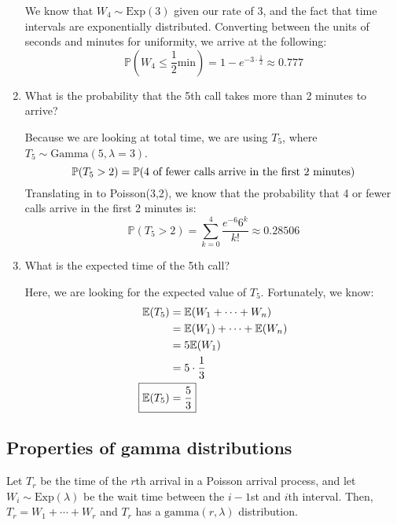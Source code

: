 \documentclass[titlepage, 12pt, leqno]{article}
\begin{document}
\begin{ex}
\begin{enumerate}
            We know that $W_4 \sim \text{Exp}(3)$ given our rate of 3, and the 
            fact that time intervals are exponentially distributed. Converting
            between the units of seconds and minutes for uniformity, we arrive
            at the following:
            \[
                \mathbb{P}\left(W_4 \le \frac{1}{2} \text{min}\right) = 
                1-e^{-3 \cdot \frac{1}{2}} \boxed{\approx 0.777}
            \]
        \item What is the probability that the 5th call takes more than 2 minutes
            to arrive?
            \vspace{10px}
            
            Because we are looking at total time, we are using $T_5$, where
            $T_5 \sim \text{Gamma}(5, \lambda=3)$.
            \[
               \mathbb{P}(T_5 > 2) = \mathbb{P}( \text{4 of fewer calls arrive
               in the first 2 minutes}) \\
            \]
            Translating in to Poisson(3,2), we know that the probability that
            4 or fewer calls arrive in the first 2 minutes is:
            \[
                \mathbb{P}(T_5 > 2) = \sum_{k=0}^{4}\frac{e^{-6}6^k}{k!}
                \boxed{\approx 0.28506} 
            \]
        \item What is the expected time of the 5th call?
            \vspace{10px}
            
            Here, we are looking for the expected value of $T_5$. Fortunately,
            we know:
           \begin{align*}
               \mathbb{E}(T_5) &= \mathbb{E}(W_1 + \cdots + W_n) \\
                               &= \mathbb{E}(W_1) + \cdots + \mathbb{E}(W_n) \\
                               &= 5 \mathbb{E}(W_1) \\
                               &= 5 \cdot \frac{1}{3} \\
               \Aboxed{ \mathbb{E}(T_5) &= \frac{5}{3}} 
           \end{align*}
    \end{enumerate}
\end{ex}

\subsection{Properties of gamma distributions}
Let $T_r$ be the time of the $r$th arrival in a Poisson arrival process, and let
$W_i \sim \text{Exp}(\lambda)$ be the wait time between the $i-1$st and $i$th
interval. Then, $T_r = W_1 + \cdots + W_r$ and $T_r$ has a $ \text{gamma}(
r, \lambda)$ distribution.
\end{document}
